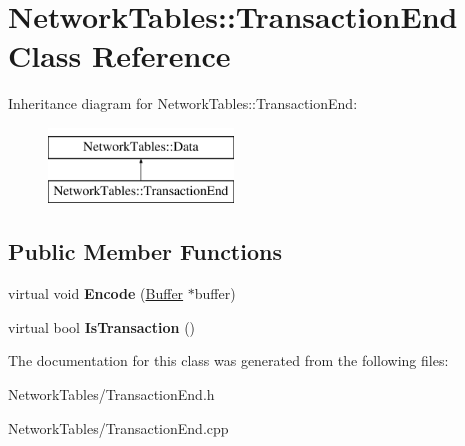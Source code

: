 \hypertarget{classNetworkTables_1_1TransactionEnd}{
\section{NetworkTables::TransactionEnd Class Reference}
\label{classNetworkTables_1_1TransactionEnd}
}
Inheritance diagram for NetworkTables::TransactionEnd:\begin{figure}[H]
\begin{center}
\leavevmode
\includegraphics[height=2.000000cm]{classNetworkTables_1_1TransactionEnd}
\end{center}
\end{figure}
\subsection*{Public Member Functions}
\begin{DoxyCompactItemize}
\item 
\hypertarget{classNetworkTables_1_1TransactionEnd_a71a97007370454b87376e87f655d02e8}{
virtual void {\bfseries Encode} (\hyperlink{classNetworkTables_1_1Buffer}{Buffer} $\ast$buffer)}
\label{classNetworkTables_1_1TransactionEnd_a71a97007370454b87376e87f655d02e8}

\item 
\hypertarget{classNetworkTables_1_1TransactionEnd_a0f129a7cd2af625384e9006c77729728}{
virtual bool {\bfseries IsTransaction} ()}
\label{classNetworkTables_1_1TransactionEnd_a0f129a7cd2af625384e9006c77729728}

\end{DoxyCompactItemize}


The documentation for this class was generated from the following files:\begin{DoxyCompactItemize}
\item 
NetworkTables/TransactionEnd.h\item 
NetworkTables/TransactionEnd.cpp\end{DoxyCompactItemize}
